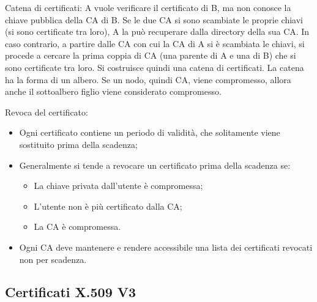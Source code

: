 Catena di certificati: A vuole verificare il certificato di B, ma non conosce la chiave pubblica della CA di B. Se le due CA si sono scambiate le proprie chiavi (si sono certificate tra loro), A la può recuperare dalla directory della sua CA. In caso contrario, a partire dalle CA con cui la CA di A si è scambiata le chiavi, si procede a cercare la prima coppia di CA (una parente di A e una di B) che si sono certificate tra loro. Si costruisce quindi una catena di certificati. La catena ha la forma di un albero. Se un nodo, quindi CA, viene compromesso, allora anche il sottoalbero figlio viene considerato compromesso.

Revoca del certificato:
\begin{itemize}
    \item Ogni certificato contiene un periodo di validità, che solitamente viene sostituito prima della scadenza;
	\item Generalmente si tende a revocare un certificato prima della scadenza se:
	\begin{itemize}
	    \item La chiave privata dall'utente è compromessa;
		\item L'utente non è più certificato dalla CA;
		\item La CA è compromessa.
	\end{itemize}
	\item Ogni CA deve mantenere e rendere accessibile una lista dei certificati revocati non per scadenza.
\end{itemize}

\subsection{Certificati X.509 V3}

